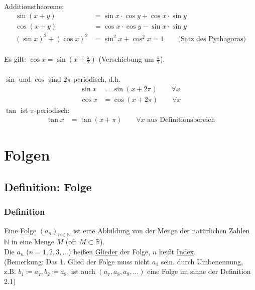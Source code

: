 \documentclass[12pt, titlepage]{article}
\newcommand{\R}{\mathds{R}}
\newcommand{\N}{\mathds{N}}
\renewcommand{\>}{\rightarrow}
\renewcommand{\*}{\cdot}
\begin{document}
\begin{itemize}
\\
	Additionstheoreme:
	\begin{align*}
		\sin (x+y)&=\sin x\*\cos y+\cos x\* \sin y\\
		\cos(x+y)&=\cos x\*\cos y-\sin x\*\sin y\\
		(\sin x)^2+(\cos x)^2&=\sin^2x+\cos^2x=1\qquad\textrm{(Satz des Pythagoras)}
	\end{align*}
	\\
	Es gilt: $\cos x=\sin (x+\frac{\pi}{2})$ (Verschiebung um $\frac{\pi}{2}$).\\
	\\
	$\sin$ und $\cos$ sind $2\pi$-periodisch, d.h.
	\begin{align*}
		\sin x&=\sin(x+2\pi)\qquad\forall x\\
		\cos x&=\cos (x+2\pi)\qquad\forall x
	\end{align*}
	$\tan$ ist $\pi$-periodisch:
	\begin{align*}
		\tan x&=\tan(x+\pi)\qquad\forall x\textrm{ aus Definitionsbereich}
	\end{align*}
	\end{itemize}
	\newpage
	\section{Folgen}
	\subsection{Definition: Folge}
	\subsubsection*{Definition}
	Eine \underline{Folge} $(a_n)_{n\in\N}$ ist eine Abbildung von der Menge der natürlichen Zahlen $\N$ in eine Menge $M$ (oft $M\subset \R$).\\
	Die $a_n$ ($n=1,2,3,...$) heißen \underline{Glieder} der Folge, $n$ heißt \underline{Index}.\\
	(Bemerkung: Das 1. Glied der Folge muss nicht $a_1$ sein. durch Umbenennung, z.B. $b_1\coloneqq a_7, b_2\coloneqq a_8$, ist auch $(a_7, a_8, a_9, ...)$ eine Folge im sinne der Definition 2.1)
\end{document}
